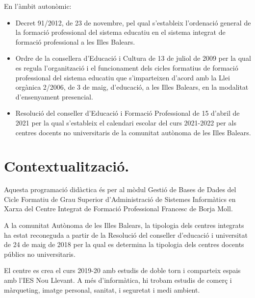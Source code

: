 \documentclass[catalan, a4paper, 12pt, titlepage]{article}
\begin{document}
En l'àmbit autonòmic:
\begin{itemize}
	\item Decret 91/2012, de 23 de novembre, pel qual s'estableix l'ordenació general de la formació professional del sistema educatiu en el sistema integrat de formació professional a les Illes Balears.
	\item Ordre de la consellera d'Educació i Cultura de 13 de juliol de 2009 per la qual es regula l'organització i el funcionament dels cicles formatius de formació professional del sistema educatiu que s'imparteixen d'acord amb la Llei orgànica 2/2006, de 3 de maig, d'educació, a les Illes Balears, en la modalitat d'ensenyament presencial.
	\item Resolució del conseller d’Educació i Formació Professional de 15 d’abril de 2021 per la qual s’estableix el calendari escolar del curs 2021-2022 per als centres docents no universitaris de la comunitat autònoma de les Illes Balears.
\end{itemize}


\section{Contextualització.}
\label{sec:contextualització}

Aquesta programació didàctica és per al mòdul Gestió de Bases de Dades del Cicle Formatiu de Grau Superior d'Administració de Sistemes Informàtics en Xarxa del Centre Integrat de Formació Professional Francesc de Borja Moll. 

A la comunitat Autònoma de les Illes Balears, la tipologia dels centres integrats ha estat reconeguda a partir de la Resolució del conseller d'educació i universitat de 24 de maig de 2018 per la qual es determina la tipologia dels centres docents públics no universitaris.

El centre es crea el curs 2019-20 amb estudis de doble torn i comparteix espais amb l'IES Nou Llevant. A més d'informàtica, hi trobam estudis de comerç i màrqueting, imatge personal, sanitat, i seguretat i medi ambient.
\end{document}
